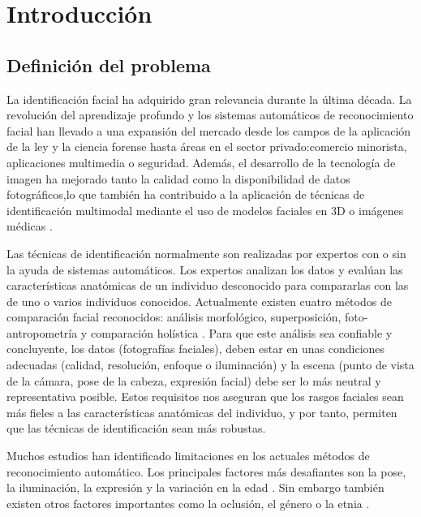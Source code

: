 \chapter{Introducción}
\thispagestyle{empty}

\section{Definición del problema}
La identificación facial ha adquirido gran relevancia durante la última década. La revolución del aprendizaje profundo y los sistemas automáticos de reconocimiento facial han llevado a una expansión del mercado desde los campos de la aplicación de la ley y la ciencia forense hasta áreas en el sector privado:comercio minorista, aplicaciones multimedia o seguridad. Además, el desarrollo de la tecnología de imagen ha mejorado tanto la calidad como la disponibilidad de datos fotográficos,lo que también ha contribuido a la aplicación de técnicas de identificación multimodal mediante el uso de modelos faciales en 3D o imágenes médicas \cite{1,2}.

Las técnicas de identificación normalmente son realizadas por expertos con o sin la ayuda de sistemas automáticos. Los expertos analizan los datos y evalúan las características anatómicas de un individuo desconocido para compararlas con las de uno o varios individuos conocidos. Actualmente existen cuatro métodos de comparación facial reconocidos: análisis morfológico, superposición, foto-antropometría y comparación holística \cite{3}.
Para que este análisis sea confiable y concluyente, los datos (fotografías faciales), deben estar en unas condiciones adecuadas (calidad, resolución, enfoque o iluminación) y la escena (punto de vista de la cámara, pose de la cabeza, expresión facial) debe ser lo más neutral y representativa posible. Estos requisitos nos aseguran que los rasgos faciales sean más fieles a las características anatómicas del individuo, y por tanto, permiten que las técnicas de identificación sean más robustas.

Muchos estudios han identificado limitaciones en los actuales métodos de reconocimiento automático. Los principales factores más desafiantes son la pose, la iluminación, la expresión y la variación en la edad \cite{4,6}. Sin embargo también existen otros factores importantes como la oclusión, el género o la etnia \cite{5,7}.

